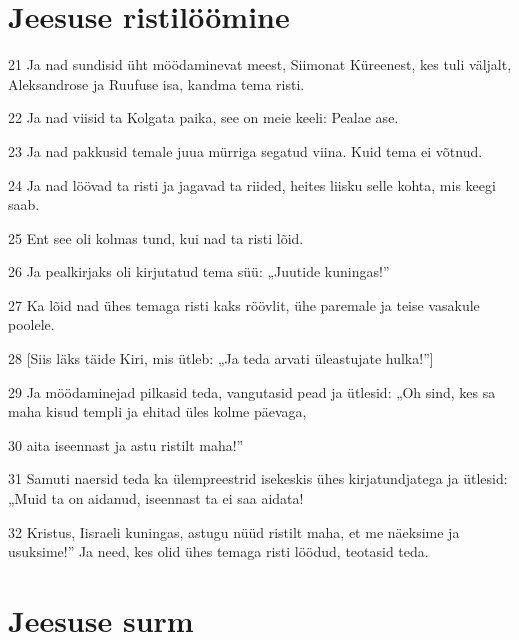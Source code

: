 \section*{Jeesuse ristilöömine}

\par 21 Ja nad sundisid üht möödaminevat meest, Siimonat Küreenest, kes tuli väljalt, Aleksandrose ja Ruufuse isa, kandma tema risti.
\par 22 Ja nad viisid ta Kolgata paika, see on meie keeli: Pealae ase.
\par 23 Ja nad pakkusid temale juua mürriga segatud viina. Kuid tema ei võtnud.
\par 24 Ja nad löövad ta risti ja jagavad ta riided, heites liisku selle kohta, mis keegi saab.
\par 25 Ent see oli kolmas tund, kui nad ta risti lõid.
\par 26 Ja pealkirjaks oli kirjutatud tema süü: „Juutide kuningas!”
\par 27 Ka lõid nad ühes temaga risti kaks röövlit, ühe paremale ja teise vasakule poolele.
\par 28 [Siis läks täide Kiri, mis ütleb: „Ja teda arvati üleastujate hulka!”]
\par 29 Ja möödaminejad pilkasid teda, vangutasid pead ja ütlesid: „Oh sind, kes sa maha kisud templi ja ehitad üles kolme päevaga,
\par 30 aita iseennast ja astu ristilt maha!”
\par 31 Samuti naersid teda ka ülempreestrid isekeskis ühes kirjatundjatega ja ütlesid: „Muid ta on aidanud, iseennast ta ei saa aidata!
\par 32 Kristus, Iisraeli kuningas, astugu nüüd ristilt maha, et me näeksime ja usuksime!” Ja need, kes olid ühes temaga risti löödud, teotasid teda.

\section*{Jeesuse surm}

